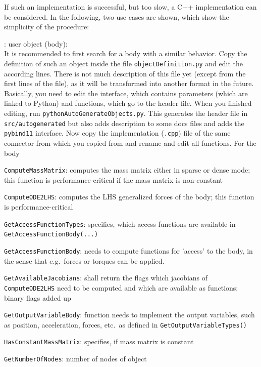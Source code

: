 If such an implementation is successful, but too slow, a C++ implementation can be considered.
In the following, two use cases are shown, which show the simplicity of the procedure:
\bi
  \item {}: user object (body):\\
  It is recommended to first search for a body with a similar behavior.
  Copy the definition of such an object inside the file \texttt{objectDefinition.py} and edit the according lines. 
  There is not much description of 
  this file yet (except from the first lines of the file), as it will be transformed into another format in the future.
  Basically, you need to edit the interface, which contains parameters (which are linked to Python) and functions, 
  which go to the header file.
  When you finished editing, run \texttt{pythonAutoGenerateObjects.py}. This generates the header file in \texttt{src/autogenerated}
  but also adds description to some docs files and adds the \texttt{pybind11} interface. 
  Now copy the implementation (\texttt{.cpp}) file of the same connector from which you copied from and rename and edit all functions.
  For the body
  \bi
    \item \texttt{ComputeMassMatrix}: computes the mass matrix either in sparse or dense mode; this function is performance-critical if the mass matrix is non-constant
    \item \texttt{ComputeODE2LHS}: computes the \ac{LHS} generalized forces of the body; this function is performance-critical
    \item \texttt{GetAccessFunctionTypes}: specifies, which access functions are available in \\ \texttt{GetAccessFunctionBody(...)}
    \item \texttt{GetAccessFunctionBody}: needs to compute functions for 'access' to the body, in the sense that e.g.\ forces or torques can be applied. 
    \item \texttt{GetAvailableJacobians}: shall return the flags which jacobians of \texttt{ComputeODE2LHS} need to be computed and which are available as functions; binary flags added up
    \item \texttt{GetOutputVariableBody}: function needs to implement the output variables, such as position, acceleration, forces, etc.\ as defined in \texttt{GetOutputVariableTypes()}
    \item \texttt{HasConstantMassMatrix}: specifies, if mass matrix is constant
    \item \texttt{GetNumberOfNodes}: number of nodes of object

